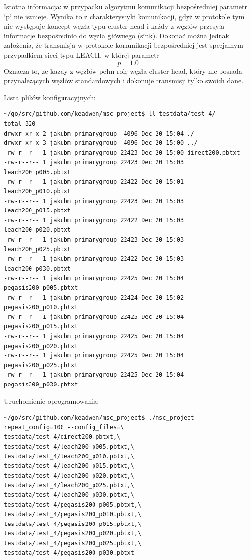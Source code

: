 \documentclass[a4paper,12pt,twoside,openany]{report}
\begin{document}
Istotna informacja: w przypadku algorytmu komunikacji bezpośredniej parametr `p` nie istnieje. Wynika to z charakterystyki komunikacji, gdyż w protokole
tym nie występuje koncept węzła typu cluster head i każdy z węzłów przesyła informacje bezpośrednio do węzła głównego (sink). Dokonać można jednak założenia, że 
transmisja w protokole komunikacji bezpośredniej jest specjalnym przypadkiem sieci typu LEACH, w której parametr \[ p = 1.0 \]
Oznacza to, że każdy z węzłów pełni rolę węzła cluster head, który nie posiada przynależących węzłów standardowych i dokonuje transmisji tylko swoich dane.

Lista plików konfiguracyjnych:

\begin{lstlisting}
~/go/src/github.com/keadwen/msc_project$ ll testdata/test_4/
total 320
drwxr-xr-x 2 jakubm primarygroup  4096 Dec 20 15:04 ./
drwxr-xr-x 3 jakubm primarygroup  4096 Dec 20 15:00 ../
-rw-r--r-- 1 jakubm primarygroup 22423 Dec 20 15:00 direct200.pbtxt
-rw-r--r-- 1 jakubm primarygroup 22423 Dec 20 15:03 leach200_p005.pbtxt
-rw-r--r-- 1 jakubm primarygroup 22422 Dec 20 15:01 leach200_p010.pbtxt
-rw-r--r-- 1 jakubm primarygroup 22423 Dec 20 15:03 leach200_p015.pbtxt
-rw-r--r-- 1 jakubm primarygroup 22422 Dec 20 15:03 leach200_p020.pbtxt
-rw-r--r-- 1 jakubm primarygroup 22423 Dec 20 15:03 leach200_p025.pbtxt
-rw-r--r-- 1 jakubm primarygroup 22422 Dec 20 15:03 leach200_p030.pbtxt
-rw-r--r-- 1 jakubm primarygroup 22425 Dec 20 15:04 pegasis200_p005.pbtxt
-rw-r--r-- 1 jakubm primarygroup 22424 Dec 20 15:02 pegasis200_p010.pbtxt
-rw-r--r-- 1 jakubm primarygroup 22425 Dec 20 15:04 pegasis200_p015.pbtxt
-rw-r--r-- 1 jakubm primarygroup 22425 Dec 20 15:04 pegasis200_p020.pbtxt
-rw-r--r-- 1 jakubm primarygroup 22425 Dec 20 15:04 pegasis200_p025.pbtxt
-rw-r--r-- 1 jakubm primarygroup 22425 Dec 20 15:04 pegasis200_p030.pbtxt
\end{lstlisting}

Uruchomienie oprogramowania:

\begin{lstlisting}
~/go/src/github.com/keadwen/msc_project$ ./msc_project --repeat_config=100 --config_files=\
testdata/test_4/direct200.pbtxt,\
testdata/test_4/leach200_p005.pbtxt,\
testdata/test_4/leach200_p010.pbtxt,\
testdata/test_4/leach200_p015.pbtxt,\
testdata/test_4/leach200_p020.pbtxt,\
testdata/test_4/leach200_p025.pbtxt,\
testdata/test_4/leach200_p030.pbtxt,\
testdata/test_4/pegasis200_p005.pbtxt,\
testdata/test_4/pegasis200_p010.pbtxt,\
testdata/test_4/pegasis200_p015.pbtxt,\
testdata/test_4/pegasis200_p020.pbtxt,\
testdata/test_4/pegasis200_p025.pbtxt,\
testdata/test_4/pegasis200_p030.pbtxt
\end{lstlisting}
\end{document}
